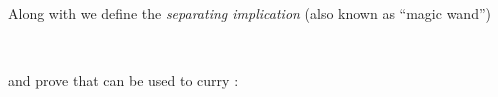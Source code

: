 Along with  we define the \emph{separating implication} (also
known as ``magic wand'')
\begin{code}%
\>[0]\AgdaSpace{}%
\AgdaSymbol{:}\AgdaSpace{}%
\AgdaSpace{}%
\AgdaSpace{}%
\AgdaSymbol{\AgdaUnderscore{}}\AgdaSpace{}%
\AgdaSpace{}%
\AgdaSpace{}%
\AgdaSpace{}%
\AgdaSymbol{\AgdaUnderscore{}}\AgdaSpace{}%
\AgdaSpace{}%
\AgdaSpace{}%
\AgdaSpace{}%
\<%
\\
\>[0]\AgdaSymbol{(}\AgdaSpace{}%
\AgdaSpace{}%
\AgdaSymbol{)}\AgdaSpace{}%
\AgdaSpace{}%
\AgdaSymbol{=}\AgdaSpace{}%
\AgdaSpace{}%
\AgdaSymbol{\}}\AgdaSpace{}%
\AgdaSpace{}%
\AgdaSpace{}%
\AgdaSpace{}%
\AgdaSpace{}%
\AgdaOperator{\AgdaDatatype{+}}\AgdaSpace{}%
\AgdaSpace{}%
\AgdaSpace{}%
\AgdaSpace{}%
\AgdaSpace{}%
\AgdaSpace{}%
\AgdaSpace{}%
\<%
\end{code}
and prove that  can be used to curry :
\begin{code}%
\>[0]\AgdaSpace{}%
\AgdaSymbol{:}\AgdaSpace{}%
\AgdaSpace{}%
\AgdaSpace{}%
\AgdaSymbol{\}}\AgdaSpace{}%
\AgdaSpace{}%
\AgdaFunction{∀[}\AgdaSpace{}%
\AgdaSpace{}%
\AgdaSpace{}%
\AgdaSpace{}%
\AgdaSpace{}%
\AgdaSpace{}%
\AgdaFunction{]}\AgdaSpace{}%
\AgdaSpace{}%
\AgdaFunction{∀[}\AgdaSpace{}%
\AgdaSpace{}%
\AgdaSpace{}%
\AgdaSpace{}%
\AgdaSpace{}%
\AgdaSpace{}%
\AgdaFunction{]}\<%
\\
\>[0]\AgdaSpace{}%
\AgdaSpace{}%
\AgdaSpace{}%
\AgdaSpace{}%
\AgdaSpace{}%
\AgdaSymbol{=}\AgdaSpace{}%
\AgdaSpace{}%
\AgdaSymbol{(}\AgdaSpace{}%
\AgdaSpace{}%
\AgdaSpace{}%
\AgdaSpace{}%
\AgdaSymbol{)}\<%
\end{code}

